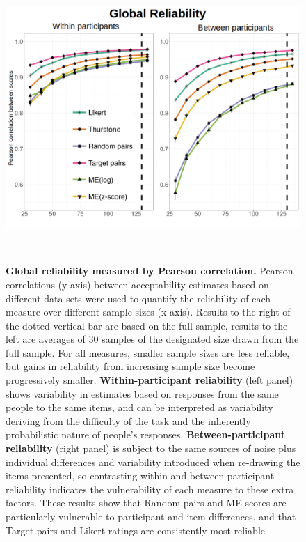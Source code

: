 \documentclass[doc]{apa6}
\newcommand{\targchoice}{{\sc Target pairs}}
\newcommand{\rndchoice}{{\sc Random pairs}}
\newcommand{\ME}{{\sc ME}}%
\newcommand{\likert}{{\sc Likert}}
\begin{document}
\begin{figure}[t]
\centering
\includegraphics[height=11cm,keepaspectratio]
{figures/reliability_correlations.png}
\caption{{\small {\bf Global reliability measured by Pearson correlation.} Pearson correlations (y-axis) between acceptability estimates based on different data sets were used to quantify the reliability of each measure over different sample sizes (x-axis). Results to the right of the dotted vertical bar are based on the full sample, results to the left are averages of 30 samples of the designated size drawn from the full sample. For all measures, smaller sample sizes are less reliable, but gains in reliability from increasing sample size become progressively smaller.
{\bf Within-participant reliability} (left panel) shows variability in estimates based on responses from the same people to the same items, and can be interpreted as variability deriving from the difficulty of the task and the inherently probabilistic nature of people's responses.
{\bf Between-participant reliability} (right panel) is subject to the same sources of noise plus individual differences and variability introduced when re-drawing the items presented, so contrasting within and between participant reliability indicates the vulnerability of each measure to these extra factors.
These results show that \rndchoice{} and \ME{} scores are particularly vulnerable to participant and item differences, and that \targchoice{} and \likert{} ratings are consistently most reliable
}}
\label{reliability_correlation}
\end{figure}
\end{document}
